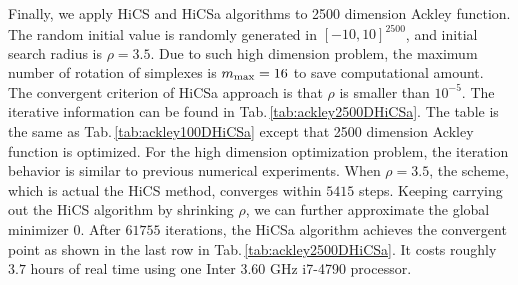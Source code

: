 \documentclass[final,1p,times]{elsarticle}
\begin{document}
Finally, we apply HiCS and HiCSa algorithms to 2500 dimension Ackley function.
The random initial value is randomly generated in
$[-10,10]^{2500}$, and initial search radius is $\rho=3.5$. 
Due to such high dimension problem, the maximum number of
rotation of simplexes is $m_{\rm max}=16$ to save computational amount.
The convergent criterion of HiCSa approach is that $\rho$ is 
smaller than $10^{-5}$.
The iterative information can be found in
Tab.\,\ref{tab:ackley2500DHiCSa}.
The table is the same as Tab.\,\ref{tab:ackley100DHiCSa} except
that 2500 dimension Ackley function is optimized. 
For the high dimension optimization problem, the iteration
behavior is similar to previous numerical experiments. 
When $\rho=3.5$, the scheme, which is actual the HiCS method,
converges within $5415$ steps. Keeping carrying out the HiCS algorithm
by shrinking $\rho$, we can further approximate the global
minimizer $0$. After $61755$ iterations, the HiCSa algorithm 
achieves the convergent point as shown in the last row in
Tab.\,\ref{tab:ackley2500DHiCSa}. It costs roughly $3.7$ hours 
of real time using one Inter 3.60 GHz i7-4790 processor.
\end{document}

